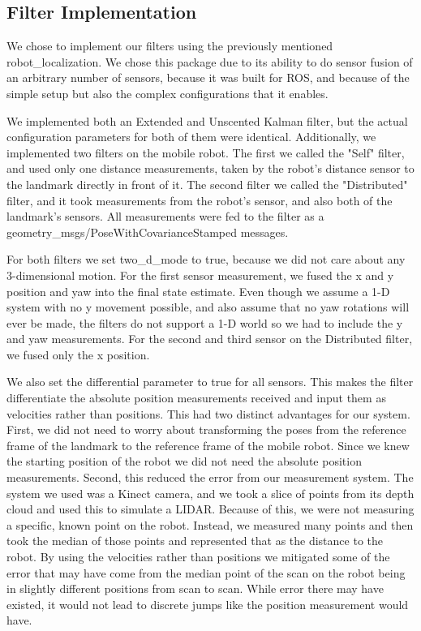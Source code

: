 \documentclass[conference]{IEEEtran} \usepackage[T1]{fontenc} \usepackage[backend=biber, style=ieee]{biblatex}
\begin{document}
\subsection{Filter Implementation} \label{Filter Implementation} We chose to implement our filters using the previously
mentioned robot\_localization. We chose this package due to its ability to do sensor fusion of an arbitrary number of
sensors, because it was built for ROS, and because of the simple setup but also the complex configurations that it
enables.

We implemented both an Extended and Unscented Kalman filter, but the actual configuration parameters for both of them
were identical. Additionally, we implemented two filters on the mobile robot. The first we called the "Self" filter, and
used only one distance measurements, taken by the robot's distance sensor to the landmark directly in front of it. The
second filter we called the "Distributed" filter, and it took measurements from the robot's sensor, and also both of the
landmark's sensors. All measurements were fed to the filter as a geometry\_msgs/PoseWithCovarianceStamped messages.

For both filters we set two\_d\_mode to true, because we did not care about any 3-dimensional motion. For the first
sensor measurement, we fused the x and y position and yaw into the final state estimate. Even though we assume a 1-D
system with no y movement possible, and also assume that no yaw rotations will ever be made, the filters do not support
a 1-D world so we had to include the y and yaw measurements. For the second and third sensor on the Distributed filter,
we fused only the x position.

We also set the differential parameter to true for all sensors. This makes the filter differentiate the absolute
position measurements received and input them as velocities rather than positions. This had two distinct advantages for
our system. First, we did not need to worry about transforming the poses from the reference frame of the landmark to the
reference frame of the mobile robot. Since we knew the starting position of the robot we did not need the absolute
position measurements. Second, this reduced the error from our measurement system. The system we used was a Kinect
camera, and we took a slice of points from its depth cloud and used this to simulate a LIDAR. Because of this, we were
not measuring a specific, known point on the robot. Instead, we measured many points and then took the median of those
points and represented that as the distance to the robot. By using the velocities rather than positions we mitigated
some of the error that may have come from the median point of the scan on the robot being in slightly different
positions from scan to scan. While error there may have existed, it would not lead to discrete jumps like the position
measurement would have.
\end{document}
